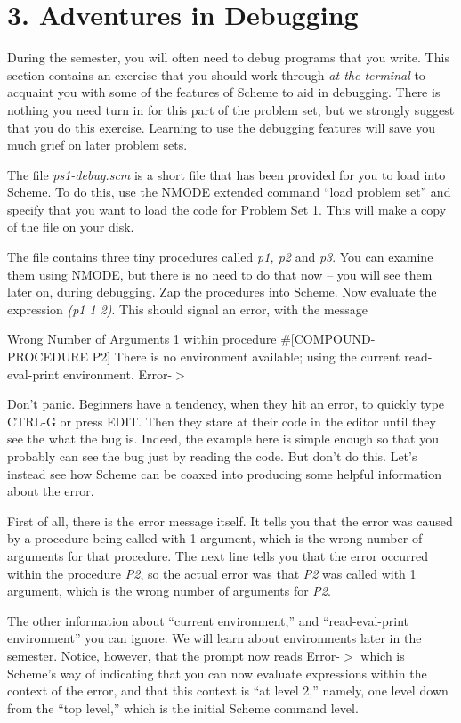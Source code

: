 \chapter{3. Adventures in Debugging}

During the semester, you will often need to debug programs that
you write.  This section contains an exercise that you
should work through {\it at the terminal} to acquaint you with some
of the features of Scheme to aid in debugging.  There is
nothing you need turn in for this part of the problem set, but we
strongly suggest that you do this exercise.   Learning to use the
debugging features will save you much grief on later problem
sets.

The file {\it ps1-debug.scm} is a short file that has been provided for
you to load into Scheme.  To do this, use the NMODE extended
command ``load problem set'' and specify that you want to load
the code for Problem Set 1.  This will make a copy of the file on
your disk.

The file contains three tiny procedures called {\it p1, p2} and
{\it p3}.  You can examine them using NMODE, but there is no need to do
that now -- you will see them later on, during debugging. Zap the
procedures into Scheme.  Now evaluate the expression {\it (p1 1 2)}.
This should signal an error, with the message

\beginlisp
Wrong Number of Arguments 1
within procedure \#[COMPOUND-PROCEDURE P2]
There is no environment available;
using the current read-eval-print environment.
 Error-$>$
\endlisp

Don't panic.  Beginners have a tendency, when they hit an error,
to quickly type CTRL-G or press EDIT. Then they stare at
their code in the editor until they see the what the bug is.
Indeed, the example here is simple enough so that you probably
can see the bug just by reading the code.  But don't do
this.  Let's instead see how Scheme can be coaxed into producing
some helpful information about the error.

First of all, there is the error message itself.  It tells you
that the error was caused by a procedure being called with 1
argument, which is the wrong number of arguments for that
procedure.  The next line tells you that the error occurred
within the procedure
{\it P2}, so the actual error was that {\it P2} was called with 1
argument, which is the wrong number of arguments for {\it P2}.

The other information about ``current environment,'' and
``read-eval-print environment'' you can ignore.  We will
learn about environments later in the semester.  Notice, however,
that the prompt now reads
 Error-$>$
\endlisp
\vpar
which is Scheme's way of indicating that you can now
evaluate expressions within the context of the error, and that
this context is ``at level 2,'' namely, one level down from the
``top level,'' which is the initial Scheme command level.

